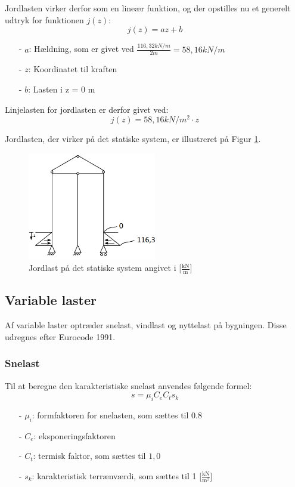 Jordlasten virker derfor som en lineær funktion, og der opstilles nu et generelt udtryk for funktionen $j(z)$: 
\begin{equation}
	j(z) = a z + b
\end{equation}

\begin{itemize}
	\item[-] $a$: Hældning, som er givet ved $\frac{116,\!32kN/m}{2m} = 58,\!16 kN/m $
	\item[-] $z$: Koordinatet til kraften
	\item[-] $b$: Lasten i z = 0 m
\end{itemize}

Linjelasten for jordlasten er derfor givet ved: 
\begin{equation}
	j(z) = 58,\!16 kN/m^2 \cdot z
\end{equation}
 
Jordlasten, der virker på det statiske system, er illustreret på Figur \ref{fig:jordlast}.

\begin{figure}[H]
	\centering
	\includegraphics[width=0.5\textwidth]{billeder/jordlast.png}
	\caption{Jordlast på det statiske system angivet i [$\frac{\text{kN}}{\text{m}}$]}
	\label{fig:jordlast}
\end{figure}

\subsection{Variable laster}
Af variable laster optræder snelast, vindlast og nyttelast på bygningen. Disse udregnes efter Eurocode 1991.

\subsubsection{Snelast}
Til at beregne den karakteristiske snelast anvendes følgende formel:
\begin{equation}
	s=\mu_iC_eC_ts_k
\end{equation}
\begin{itemize}
	\item[-] $\mu_i$: formfaktoren for snelasten, som sættes til 0.8 \citep[ tabel 5.2 kapitel 5.3]{EU91}
	\item[-] $C_e$: eksponeringsfaktoren
	\item[-] $C_t$: termisk faktor, som sættes til $1,\!0$ \citep[ kapitel 5.2]{EU91}
	\item[-] $s_k$: karakteristisk terrænværdi, som sættes til 1 [$\frac{\text{kN}}{\text{m}^2}$] \citep[ kapitel 4.1]{EU91}
\end{itemize}

